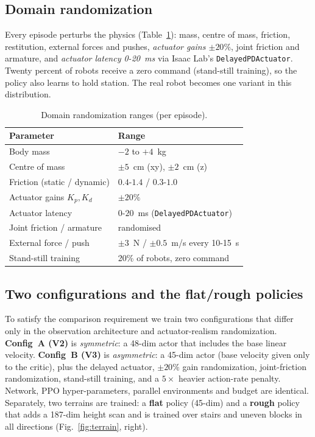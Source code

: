 \documentclass[conference]{IEEEtran}
\begin{document}
\subsection{Domain randomization}
Every episode perturbs the physics (Table~\ref{tab:dr}): mass, centre of mass, friction,
restitution, external forces and pushes, \emph{actuator gains $\pm20\%$}, joint friction and
armature, and \emph{actuator latency 0-20~ms} via Isaac Lab's \texttt{DelayedPDActuator}. Twenty
percent of robots receive a zero command (stand-still training), so the policy also learns to
hold station. The real robot becomes one variant in this distribution.

\begin{table}[t]
\caption{Domain randomization ranges (per episode).}
\label{tab:dr}
\centering
\footnotesize
\begin{tabular}{l l}
\toprule
\textbf{Parameter} & \textbf{Range} \\
\midrule
Body mass & $-2$ to $+4$~kg \\
Centre of mass & $\pm5$~cm (xy), $\pm2$~cm (z) \\
Friction (static / dynamic) & $0.4$-$1.4$ / $0.3$-$1.0$ \\
Actuator gains $K_p,K_d$ & $\pm20\%$ \\
Actuator latency & $0$-$20$~ms (\texttt{DelayedPDActuator}) \\
Joint friction / armature & randomised \\
External force / push & $\pm3$~N / $\pm0.5$~m/s every 10-15~s \\
Stand-still training & 20\% of robots, zero command \\
\bottomrule
\end{tabular}
\end{table}

\subsection{Two configurations and the flat/rough policies}
To satisfy the comparison requirement we train two configurations that differ only in the
observation architecture and actuator-realism randomization. \textbf{Config~A (V2)} is
\emph{symmetric}: a 48-dim actor that includes the base linear velocity. \textbf{Config~B (V3)}
is \emph{asymmetric}: a 45-dim actor (base velocity given only to the critic), plus the delayed
actuator, $\pm20\%$ gain randomization, joint-friction randomization, stand-still training, and a
$5\times$ heavier action-rate penalty. Network, PPO hyper-parameters, parallel environments and
budget are identical. Separately, two terrains are trained: a \textbf{flat} policy (45-dim) and a
\textbf{rough} policy that adds a 187-dim height scan and is trained over stairs and uneven blocks
in all directions (Fig.~\ref{fig:terrain}, right).
\end{document}
